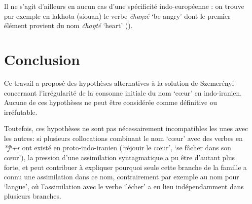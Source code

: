 \documentclass{article}
\newcommand{\ipa}[1]{{\phon\textit{#1}}}
\begin{document}
Il ne s'agit d'ailleurs en aucun cas d'une spécificité indo-européenne : on trouve par exemple en lakhota (siouan) le verbe  \ipa{čhaŋzé} `be angry' dont le premier élément provient du nom \ipa{čhaŋté} `heart' (\citealt{ullrich08}).

\section*{Conclusion}
Ce travail a proposé des hypothèses alternatives à la solution de Szemerényi concernant l'irrégularité de la consonne initiale du nom `cœur' en indo-iranien. Aucune de ces hypothèses ne peut être considérée comme définitive ou irréfutable. 

Toutefois, ces hypothèses ne sont pas nécessairement incompatibles les unes avec les autres: si plusieurs collocations combinant le nom `cœur' avec des verbes en \ipa{*j́ʰ+r} ont existé en proto-indo-iranien (`réjouir le cœur', `se fâcher dans son cœur'), la pression d'une assimilation syntagmatique a pu être d'autant plus forte, et peut contribuer à expliquer pourquoi seule cette branche de la famille a connu une assimilation dans ce nom, contrairement par exemple au nom pour `langue', où l'assimilation avec le verbe `lécher' a eu lieu indépendamment dans plusieurs branches.




\end{document}
